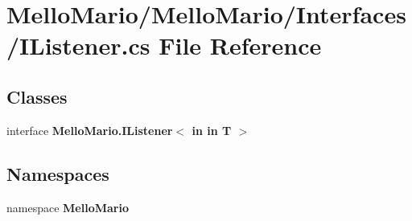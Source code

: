 \section{Mello\+Mario/\+Mello\+Mario/\+Interfaces/\+I\+Listener.cs File Reference}
\label{IListener_8cs}
\subsection*{Classes}
\begin{DoxyCompactItemize}
\item 
interface \textbf{ Mello\+Mario.\+I\+Listener$<$ in in T $>$}
\end{DoxyCompactItemize}
\subsection*{Namespaces}
\begin{DoxyCompactItemize}
\item 
namespace \textbf{ Mello\+Mario}
\end{DoxyCompactItemize}
